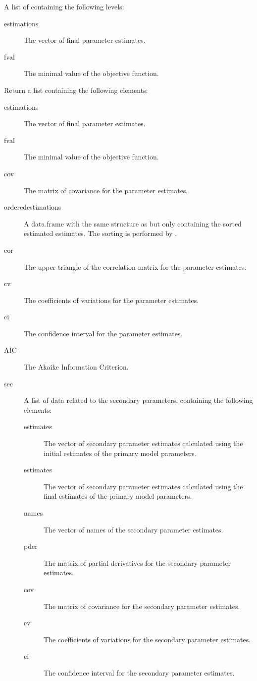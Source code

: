 \begin{Arguments}
\begin{ldescription}
\begin{description}
\end{description}


\item[\code{Fit}] A list of containing the following levels:\begin{description}

\item[estimations] The vector of final parameter estimates.
\item[fval] The minimal value of the objective function.

\end{description}


\end{ldescription}
\end{Arguments}
%
\begin{Value}
Return a list containing the following elements:\begin{description}

\item[estimations] The vector of final parameter estimates.
\item[fval] The minimal value of the objective function.
\item[cov] The matrix of covariance for the parameter estimates.
\item[orderedestimations] A data.frame with the same structure as
 but only containing the sorted estimated estimates.
The sorting is performed by .
\item[cor] The upper triangle of the correlation matrix for the parameter
estimates.
\item[cv] The coefficients of variations for the parameter estimates.
\item[ci] The confidence interval for the parameter estimates.
\item[AIC] The Akaike Information Criterion.
\item[sec] A list of data related to the secondary parameters, containing
the following elements:\begin{description}

\item[estimates] The vector of secondary parameter estimates calculated
using the initial estimates of the primary model parameters.
\item[estimates] The vector of secondary parameter estimates calculated
using the final estimates of the primary model parameters.
\item[names] The vector of names of the secondary parameter estimates.
\item[pder] The matrix of partial derivatives for the secondary
parameter estimates.
\item[cov] The matrix of covariance for the secondary parameter
estimates.
\item[cv] The coefficients of variations for the secondary parameter
estimates.
\item[ci] The confidence interval for the secondary parameter
estimates.


\end{description}
\end{description}
\end{Value}
